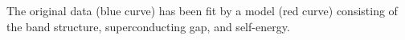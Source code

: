 The original data (blue curve) has been fit by a model (red curve) consisting of the band structure, superconducting gap, and self-energy.
